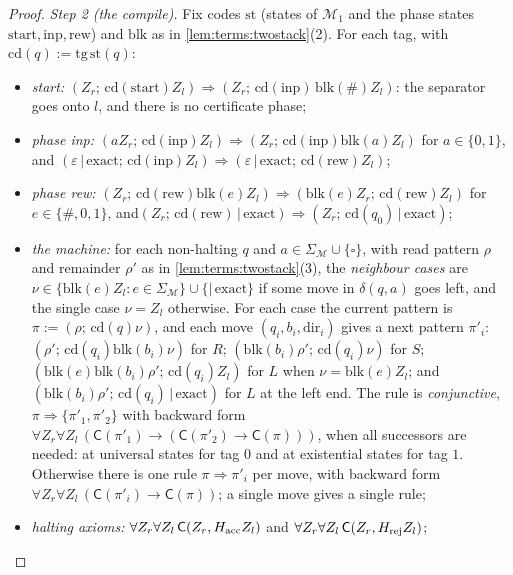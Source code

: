 \begin{proof}
\emph{Step 2 (the compile).} Fix codes $\mathrm{st}$ (states of $\mathcal M_1$ and the phase states $\mathrm{start},\mathrm{inp},\mathrm{rew}$) and $\mathrm{blk}$ as in \cref{lem:terms:twostack}(2). For each tag, with $\mathrm{cd}(q):=\mathrm{tg}\,\mathrm{st}(q)$:
\begin{itemize}[leftmargin=*]
\item \emph{start:} $(Z_r;\,\mathrm{cd}(\mathrm{start})Z_l)\Rightarrow(Z_r;\,\mathrm{cd}(\mathrm{inp})\,\mathrm{blk}(\#)Z_l)$: the separator goes onto $l$, and there is no certificate phase;
\item \emph{phase inp:} $(aZ_r;\,\mathrm{cd}(\mathrm{inp})Z_l)\Rightarrow(Z_r;\,\mathrm{cd}(\mathrm{inp})\mathrm{blk}(a)Z_l)$ for $a\in\{0,1\}$, and $(\varepsilon\,|\,\mathrm{exact};\,\mathrm{cd}(\mathrm{inp})Z_l)\Rightarrow(\varepsilon\,|\,\mathrm{exact};\,\mathrm{cd}(\mathrm{rew})Z_l)$;
\item \emph{phase rew:} $(Z_r;\,\mathrm{cd}(\mathrm{rew})\mathrm{blk}(e)Z_l)\Rightarrow(\mathrm{blk}(e)Z_r;\,\mathrm{cd}(\mathrm{rew})Z_l)$ for $e\in\{\#,0,1\}$, and\newline $(Z_r;\,\mathrm{cd}(\mathrm{rew})\,|\,\mathrm{exact})\Rightarrow(Z_r;\,\mathrm{cd}(q_0)\,|\,\mathrm{exact})$;
\item \emph{the machine:} for each non-halting $q$ and $a\in\Sigma_{\mathcal M}\cup\{\square\}$, with read pattern $\rho$ and remainder $\rho'$ as in \cref{lem:terms:twostack}(3), the \emph{neighbour cases} are $\nu\in\{\mathrm{blk}(e)Z_l:e\in\Sigma_{\mathcal M}\}\cup\{|\,\mathrm{exact}\}$ if some move in $\delta(q,a)$ goes left, and the single case $\nu=Z_l$ otherwise. For each case the current pattern is $\pi:=(\rho;\,\mathrm{cd}(q)\nu)$, and each move $(q_i,b_i,\mathrm{dir}_i)$ gives a next pattern $\pi'_i$: $(\rho';\,\mathrm{cd}(q_i)\mathrm{blk}(b_i)\nu)$ for $R$; $(\mathrm{blk}(b_i)\rho';\,\mathrm{cd}(q_i)\nu)$ for $S$; $(\mathrm{blk}(e)\mathrm{blk}(b_i)\rho';\,\mathrm{cd}(q_i)Z_l)$ for $L$ when $\nu=\mathrm{blk}(e)Z_l$; and $(\mathrm{blk}(b_i)\rho';\,\mathrm{cd}(q_i)\,|\,\mathrm{exact})$ for $L$ at the left end. The rule is \emph{conjunctive}, $\pi\Rightarrow\{\pi'_1,\pi'_2\}$ with backward form $\forall Z_r\forall Z_l\,(\mathsf C(\pi'_1)\to(\mathsf C(\pi'_2)\to\mathsf C(\pi)))$, when all successors are needed: at universal states for tag $0$ and at existential states for tag $1$. Otherwise there is one rule $\pi\Rightarrow\pi'_i$ per move, with backward form $\forall Z_r\forall Z_l\,(\mathsf C(\pi'_i)\to\mathsf C(\pi))$; a single move gives a single rule;
\item \emph{halting axioms:} $\forall Z_r\forall Z_l\,\mathsf C(Z_r,H_{\rm acc}Z_l)$ and $\forall Z_r\forall Z_l\,\mathsf C(Z_r,H_{\rm rej}Z_l)$;

\end{itemize}
\end{proof}
